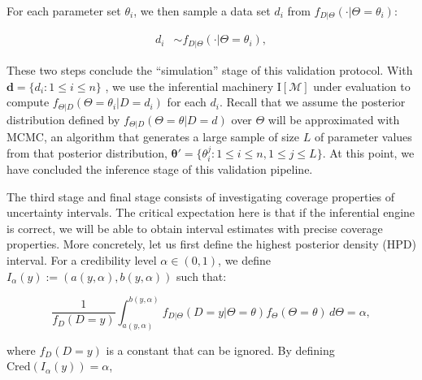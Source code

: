 \documentclass[oneside]{article}
\begin{document}
For each parameter set $\theta_i$, we then sample a data set
$d_i$ from
$f_{D|\Theta}(\cdot|\Theta=\theta_i)$:

\vspace{-1cm}
\begin{align*}
   d_i & \sim  f_{D|\Theta}(\cdot | \Theta=\theta_i),
\end{align*}

These two steps conclude the ``simulation'' stage of this validation protocol.
With
$\boldsymbol{d} = \{d_i: 1 \leq i \leq n\}$
, we use the inferential machinery $\text{I}[\mathcal{M}]$ under
evaluation to compute
$f_{\Theta|D}(\Theta=\theta_i|D=d_i)$ for each $d_i$.
Recall that we assume the posterior distribution defined by $f_{\Theta|D}(\Theta=\theta|D=d)$ over $\Theta$
will be approximated with MCMC, an algorithm that generates a large sample of size $L$ of
parameter values from that posterior distribution, $\boldsymbol{\theta}' =
\{ \theta_i^j: 1 \leq i \leq n, 1 \leq j \leq L\}$.
At this point, we have concluded the inference stage of this validation pipeline.

The third stage and final stage consists of investigating coverage properties of uncertainty intervals.
The critical expectation here is that if the inferential engine is correct, we will be able to obtain interval estimates with precise coverage properties.
More concretely, let us first define the highest posterior density (HPD) interval.
For a credibility level $\alpha \in (0, 1)$, we define $I_\alpha(y) := (a(y, \alpha), b(y, \alpha))$
such that:


\begin{equation*}
  \frac{1}{f_D(D=y)} \int_{a(y, \alpha)}^{b(y,\alpha)} f_{D|\Theta}(D=y | \Theta=\theta)f_\Theta(\Theta=\theta)\, d\Theta = \alpha,
\end{equation*}

\noindent where
$f_D(D=y)$
is a constant that can be ignored.
By defining $\text{Cred}(I_\alpha(y)) = \alpha$,
\end{document}

